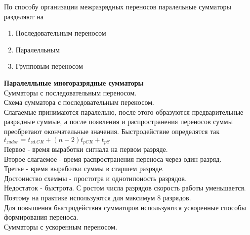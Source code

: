 По способу организации межразрядных переносов паралельные сумматоры разделяют на
\begin{enumerate}
  \item Последовательным переносом
  \item Паралелльным
  \item Групповым переносом
\end{enumerate}

\Large{ \textbf {Паралелльные многоразрядные сумматоры}}\\
Сумматоры с последовательным переносом.\\

Схема сумматора с последовательным переносом.\\

Слагаемые принимаются паралельно, после этого образуются предварительные разрядные суммые, а после появления и распространения  переносов суммы преобретают окончательные значения.
Быстродействие определятся так $ t_{zadsr} = t_{zd.CR} + (n-2) t_{pCR} + t_{pS}  $\\
Первое - время выработки сигнала на первом разряде.\\
Второе слагаемое - время распространения переноса через один разряд.\\
Третье - время выработки суммы в старшем разряде.\\
Достоинство схеммы - простотра и однотипоность разрядов.\\
Недостаток - быстрота. С ростом числа разрядов скорость работы уменьшается. Поэтому на практике используются для максимум 8 разрядов.\\
Для повышения быстродействия сумматоров используются ускоренные способы формирования переноса.\\

Сумматоры с ускоренным переносом.\\

